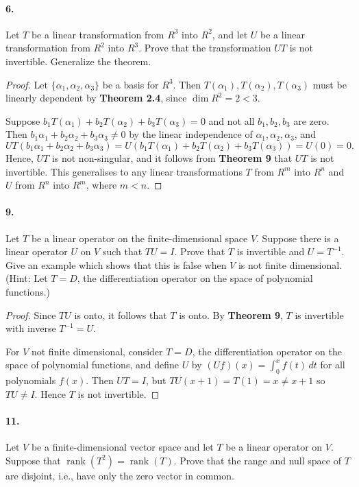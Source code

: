 \documentclass{article}
\DeclareMathOperator{\rank}{rank}
\begin{document}
\paragraph{6.} Let $T$ be a linear transformation from $R^3$ into $R^2$, and let
$U$ be a linear transformation from $R^2$ into $R^3$. Prove that the
transformation $UT$ is not invertible. Generalize the theorem.

\begin{proof}
  Let $\{\alpha_1, \alpha_2, \alpha_3\}$ be a basis for $R^3$. Then
  $T(\alpha_1), T(\alpha_2), T(\alpha_3)$ must be linearly dependent by
  \textbf{Theorem 2.4}, since $\dim R^2 = 2 < 3$.

  Suppose $b_1T(\alpha_1) + b_2T(\alpha_2) + b_3T(\alpha_3) = 0$ and not all
  $b_1, b_2, b_3$ are zero. Then $b_1\alpha_1 + b_2\alpha_2 + b_3\alpha_3 \neq
  0$ by the linear independence of $\alpha_1, \alpha_2, \alpha_3$, and \[
    UT(b_1\alpha_1 + b_2\alpha_2 + b_3\alpha_3)
    = U(b_1T(\alpha_1) + b_2T(\alpha_2) + b_3T(\alpha_3))
    = U(0)
    = 0.
  \] Hence, $UT$ is not non-singular, and it follows from \textbf{Theorem 9}
  that $UT$ is not invertible. This generalises to any linear transformations
  $T$ from $R^m$ into $R^n$ and $U$ from $R^n$ into $R^m$, where $m < n$.
\end{proof}

\paragraph{9.} Let $T$ be a linear operator on the finite-dimensional space $V$.
Suppose there is a linear operator $U$ on $V$ such that $TU = I$. Prove that $T$
is invertible and $U = T^{-1}$. Give an example which shows that this is false
when $V$ is not finite dimensional. (Hint: Let $T = D$, the differentiation
operator on the space of polynomial functions.)

\begin{proof}
  Since $TU$ is onto, it follows that $T$ is onto. By \textbf{Theorem 9}, $T$ is
  invertible with inverse $T^{-1} = U$.

  For $V$ not finite dimensional, consider $T = D$, the differentiation operator
  on the space of polynomial functions, and define $U$ by $(Uf)(x) = \int_0^x
  f(t) \,dt$ for all polynomials $f(x)$. Then $UT = I$, but $TU(x + 1) = T(1) =
  x \neq x + 1$ so $TU \neq I$. Hence $T$ is not invertible.
\end{proof}

\paragraph{11.} Let $V$ be a finite-dimensional vector space and let $T$ be a
linear operator on $V$. Suppose that $\rank(T^2) = \rank(T)$. Prove that the
range and null space of $T$ are disjoint, i.e., have only the zero vector in
common.
\end{document}
